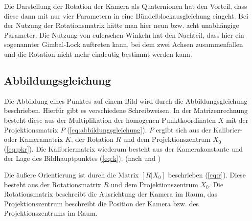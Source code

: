 \documentclass[./00PhotoBox.tex]{subfiles}
\begin{document}
Die Darstellung der Rotation der Kamera als Quaternionen hat den Vorteil, dass diese dann mit nur vier Parametern in eine Bündelblockausgleichung eingeht. Bei der Nutzung der Rotationsmatrix hätte man hier neun bzw. acht unabhängige Parameter. Die Nutzung von eulerschen Winkeln hat den Nachteil, dass hier ein sogenannter Gimbal-Lock auftreten kann, bei dem zwei Achsen zusammenfallen und die Rotation nicht mehr eindeutig bestimmt werden kann. \citep[S. 63]{luhmann}

\subsection{Abbildungsgleichung}
\label{ss:abbildungsgleichung}
Die Abbildung eines Punktes auf einem Bild wird durch die Abbildungsgleichung beschrieben. Hierfür gibt es verschiedene Schreibweisen. In der Matrizenrechnung besteht diese aus der Multiplikation der homogenen Punktkoordinaten $X$ mit der Projektionsmatrix $P$ (\autoref{eq:abbildungsgleichung}). $P$ ergibt sich aus der Kalibrier- oder Kameramatrix $K$, der Rotation $R$ und dem Projektionszentrum $X_0$ (\autoref{eq:pkr}). Die Kalibriermatrix wiederum besteht aus der Kamerakonstante und der Lage des Bildhauptpunktes (\autoref{eq:k}).
(nach \citealp[S. 244]{hartley} und \citealp[S. 290]{luhmann})

Die äußere Orientierung ist durch die Matrix $[R|X_0]$ beschrieben (\autoref{eq:r}). Diese besteht aus der Rotationsmatrix $R$ und dem Projektionszentrum $X_0$. Die Rotationsmatrix beschreibt die Ausrichtung der Kamera im Raum, das Projektionszentrum beschreibt die Position der Kamera bzw. des Projektionszentrums im Raum.
\end{document}
